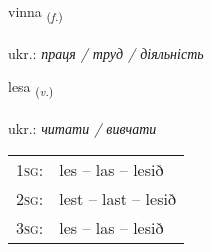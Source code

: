 \documentclass[frontgrid, backgrid]{flacards}\usepackage[]{graphicx}\usepackage[]{xcolor}
\begin{document}
\renewcommand{\flhead}{\vskip5pt \fboxsep=0pt {\small\bfseries\footnotesize Nafnorð | іменник}}
\renewcommand{\fcfoot}{\vskip5pt \fboxsep=0pt \hspace{2pt}{\small\bfseries\footnotesize 1K}}

\renewcommand{\blhead}{\vskip5pt {\small\bfseries\footnotesize Nafnorð | іменник }}
\renewcommand{\bcfoot}{\vskip5pt \hspace{2pt}{\small\bfseries\footnotesize 1K}}


{vinna \small{\textsubscript{(\textit{f.})}} \\[1ex] %
\textphonetic{[vɪna]} \\
ukr.: \emph{праця / труд / діяльність} \\  [2ex]
\renewcommand*{\arraystretch}{0.8}
}

\renewcommand{\flhead}{\vskip5pt \fboxsep=0pt {\small\bfseries\footnotesize Sagnorð | дієслово}}
\renewcommand{\fcfoot}{\vskip5pt \fboxsep=0pt \hspace{2pt}{\small\bfseries\footnotesize 1K}}

\renewcommand{\blhead}{\vskip5pt {\small\bfseries\footnotesize Sagnorð | дієслово }}
\renewcommand{\bcfoot}{\vskip5pt \hspace{2pt}{\small\bfseries\footnotesize 1K}}


{lesa \small{\textsubscript{(\textit{v.})}} \\[1ex] %
\textphonetic{[lɛːsa]} \\
ukr.: \emph{читати / вивчати} \\  [2ex]
\renewcommand*{\arraystretch}{0.8}
\begin{tabular}{p{1cm}l}
\textsc{1sg}: & les -- las -- lesið \\ 
\textsc{2sg}: & lest -- last -- lesið \\ 
\textsc{3sg}: & les -- las -- lesið \\ 
\end{tabular}
}
\end{document}
